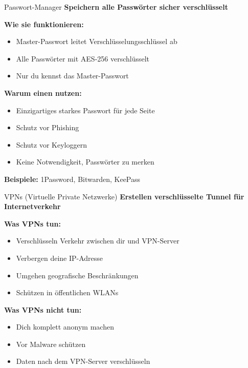 \documentclass[handout]{beamer}
\begin{document}
\begin{frame}{Passwort-Manager}
\textbf{Speichern alle Passwörter sicher verschlüsselt}

\vspace{0.3cm}
\textbf{Wie sie funktionieren:}
\begin{itemize}
    \item Master-Passwort leitet Verschlüsselungsschlüssel ab
    \item Alle Passwörter mit AES-256 verschlüsselt
    \item Nur du kennst das Master-Passwort
\end{itemize}

\vspace{0.3cm}
\textbf{Warum einen nutzen:}
\begin{itemize}
    \item Einzigartiges starkes Passwort für jede Seite
    \item Schutz vor Phishing
    \item Schutz vor Keyloggern
    \item Keine Notwendigkeit, Passwörter zu merken
\end{itemize}

\vspace{0.3cm}
\textbf{Beispiele:} 1Password, Bitwarden, KeePass
\end{frame}

\begin{frame}{VPNs (Virtuelle Private Netzwerke)}
\textbf{Erstellen verschlüsselte Tunnel für Internetverkehr}

\vspace{0.3cm}
\textbf{Was VPNs tun:}
\begin{itemize}
    \item Verschlüsseln Verkehr zwischen dir und VPN-Server
    \item Verbergen deine IP-Adresse
    \item Umgehen geografische Beschränkungen
    \item Schützen in öffentlichen WLANs
\end{itemize}

\vspace{0.3cm}
\textbf{Was VPNs nicht tun:}
\begin{itemize}
    \item Dich komplett anonym machen
    \item Vor Malware schützen
    \item Daten nach dem VPN-Server verschlüsseln
\end{itemize}

\end{frame}
\end{document}
